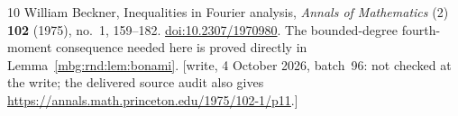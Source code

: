 \documentclass[11pt,letterpaper]{article}
\theoremstyle{definition}
\begin{document}
\begin{thebibliography}{10}
William Beckner,
Inequalities in Fourier analysis,
\emph{Annals of Mathematics} (2) \textbf{102} (1975), no.~1, 159--182.
\href{https://doi.org/10.2307/1970980}{doi:10.2307/1970980}.
The bounded-degree fourth-moment consequence needed here is proved
directly in Lemma~\ref{mbg:rnd:lem:bonami}.
{\small[write, 4 October 2026, batch~96: not checked at the write; the delivered source audit also gives \url{https://annals.math.princeton.edu/1975/102-1/p11}.]}
\end{thebibliography}
\end{document}
